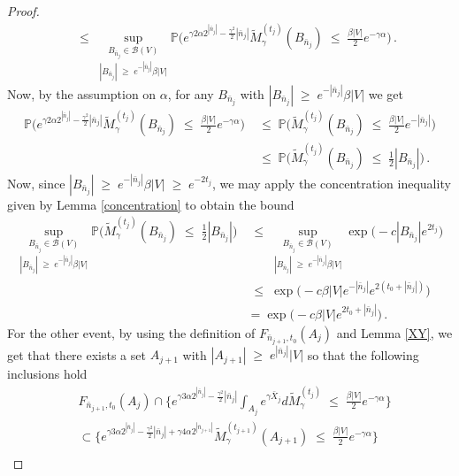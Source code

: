 \documentclass[10pt,a4paper]{amsart}
\newcommand{\Pb}{\P}
\newcommand{\ab}{|}
\renewcommand{\P}{\mathbb{P}}
\renewcommand{\geq}{\;\geqslant\;}                   %
\renewcommand{\leq}{\;\leqslant\;}                   %
\renewcommand{\tilde}{\widetilde}          %
\begin{document}
\begin{proof}
\begin{align*}
& \leq \underset{\ab B_{\bar n_j} \ab \geq e^{- \ab \bar n_j \ab } \beta \ab V \ab  }{\sup_{B_{\bar n_j} \in \mathcal{B}(V)}} \Pb \big( e^{\gamma 2 \alpha 2^{| \bar n_{j} | }  - \frac{\gamma^2}{2} |\bar n_{j}| }  \tilde M_\gamma^{(t_{j})}(B_{\bar n_j}) \leq \tfrac{\beta \ab V \ab }{2} e^{-\gamma \alpha} \big)\,.
\end{align*}
Now, by the assumption on $\alpha$, for any $B_{\bar n_j}$ with $\ab B_{\bar n_j} \ab \geq e^{- \ab \bar n_j \ab } \beta \ab V \ab$ we get 
\begin{align*}
\Pb \big( e^{\gamma 2 \alpha 2^{| \bar n_{j} | }  - \frac{\gamma^2}{2} |\bar n_{j}| }  \tilde M_\gamma^{(t_{j})}(B_{\bar n_j}) \leq \tfrac{\beta \ab V \ab }{2} e^{-\gamma \alpha} \big) & \leq \Pb \big( \tilde M_\gamma^{(t_j)}(B_{\bar n_j}) \leq \tfrac{\beta \ab V \ab }{2} e^{-|\bar n_j|} \big) \\
& \leq \Pb \big( \tilde M_\gamma^{(t_j)}(B_{\bar n_j}) \leq \tfrac 12 |B_{\bar n_j}| \big)\,.
\end{align*}
Now, since $|B_{\bar n_j}| \geq e^{-|\bar n_j|} \beta |V|  \geq e^{-2 t_j}$, we may apply the concentration inequality given by Lemma \ref{concentration} to obtain the bound
\begin{align*}
\underset{\ab B_{\bar n_j} \ab \geq e^{- \ab \bar n_j \ab } \beta \ab V \ab  }{\sup_{B_{\bar n_j} \in \mathcal{B}(V)}} \Pb \big( \tilde M_\gamma^{(t_j)}(B_{\bar n_j}) \leq \tfrac 12 |B_{\bar n_j}| \big) & \leq \underset{\ab B_{\bar n_j} \ab \geq e^{- \ab \bar n_j \ab } \beta \ab V \ab  }{\sup_{B_{\bar n_j} \in \mathcal{B}(V)}} \exp \big( -c   |B_{\bar n_j}| e^{2 t_j}  \big) \\
& \leq \exp \big( -c \beta \ab V \ab e^{- \ab \bar n_j \ab } e^{2 (t_0+ \ab \bar n_j \ab )}  \big) \\
&= \exp \big( -c \beta \ab V \ab  e^{2t_0 + \ab \bar n_j \ab }  \big)\,.
\end{align*}
For the other event, by using the definition of $F_{\bar n_{j+1}, t_0}(A_j)$ and Lemma \ref{XY}, we get that there exists a set $A_{j+1}$ with $|A_{j+1}|\geq e^{|\bar n_j|}|V|$ so that the following inclusions hold 
\begin{align*}
& F_{\bar n_{j+1}, t_0}(A_j) \cap \{ e^{\gamma 3 \alpha 2^{| \bar n_{j} | }  - \frac{\gamma^2}{2} |\bar n_{j}| } \int_{A_{j}} e^{\gamma \bar X_{j}} d \tilde M_\gamma^{(t_{j})} \leq \tfrac{\beta \ab V \ab }{2} e^{-\gamma \alpha} \}  \\
& \subset \big\{ e^{\gamma 3 \alpha 2^{| \bar n_{j} | }  - \frac{\gamma^2}{2} |\bar n_{j}| + \gamma 4\alpha 2^{|\bar n_{j+1}|} } \tilde M_\gamma^{(t_{j+1})}(A_{j+1}) \leq \tfrac{\beta \ab V \ab }{2} e^{-\gamma \alpha} \big\} \\

\end{align*}
\end{proof}
\end{document}
